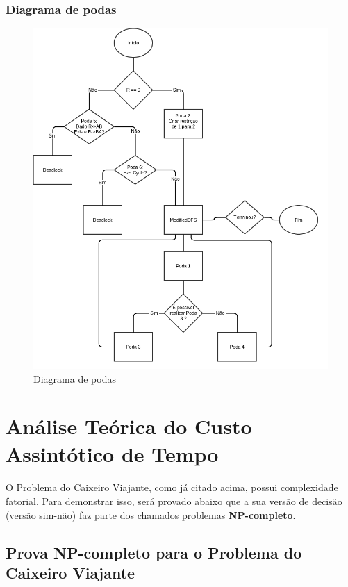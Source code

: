 \documentclass[a4paper, 12pt]{article}
\begin{document}
\subsubsection{Diagrama de podas}
\begin{figure}[!h]
\centering
\includegraphics[scale=0.4]{tp2_podas.png}
\caption{Diagrama de podas}
\end{figure}

\section{Análise Teórica do Custo Assintótico de Tempo}
\paragraph{}

O Problema do Caixeiro Viajante, como já citado acima, possui complexidade fatorial. Para demonstrar isso, será provado abaixo que a sua versão de decisão (versão sim-não) faz parte dos chamados problemas \textbf{NP-completo}.

\subsection{Prova NP-completo para o Problema do Caixeiro Viajante}
\end{document}
